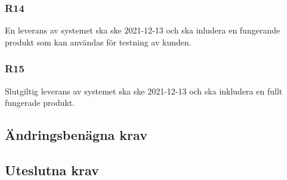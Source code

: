 \documentclass{article}
\begin{document}
     \subsubsection*{R14}
     En leverans av systemet ska ske 2021-12-13 och ska inludera en fungerande produkt som kan användas för testning av kunden.
     
     \subsubsection*{R15}
     Slutgiltig leverans av systemet ska ske 2021-12-13 och ska inkludera en fullt fungerade produkt.
     
     
    \subsection*{Ändringsbenägna krav}
    
    \subsection*{Uteslutna krav}
    
    
   

\end{document}
